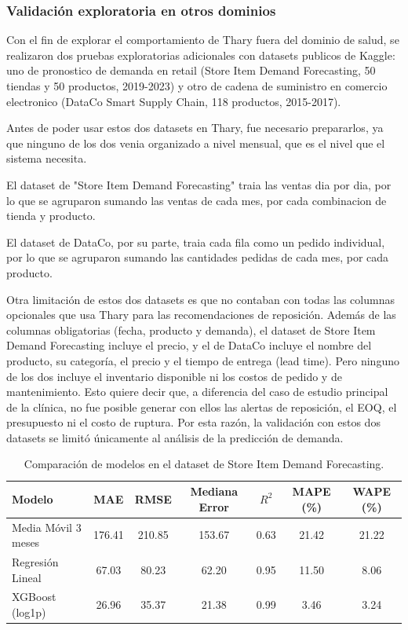 \subsubsection{Validación exploratoria en otros dominios}

Con el fin de explorar el comportamiento de Thary fuera del dominio de salud, se realizaron dos pruebas exploratorias adicionales con datasets publicos de Kaggle: uno de pronostico de demanda en retail (Store Item Demand Forecasting\cite{talukdar2023storeitem}, 50 tiendas y 50 productos, 2019-2023) y otro de cadena de suministro en comercio electronico (DataCo Smart\cite{constante2019dataco} Supply Chain, 118 productos, 2015-2017).

Antes de poder usar estos dos datasets en Thary, fue necesario prepararlos, ya que ninguno de los dos venia organizado a nivel mensual, que es el nivel que el sistema necesita.

El dataset de "Store Item Demand Forecasting" traia las ventas dia por dia, por lo que se agruparon sumando las ventas de cada mes, por cada combinacion de tienda y producto. 

El dataset de DataCo, por su parte, traia cada fila como un pedido individual, por lo que se agruparon sumando las cantidades pedidas de cada mes, por cada producto.

Otra limitación de estos dos datasets es que no contaban con todas las columnas opcionales que usa Thary para las recomendaciones de reposición. Además de las columnas obligatorias (fecha, producto y demanda), el dataset de Store Item Demand Forecasting incluye el precio, y el de DataCo incluye el nombre del producto, su categoría, el precio y el tiempo de entrega (lead time). Pero ninguno de los dos incluye el inventario disponible ni los costos de pedido y de mantenimiento. Esto quiere decir que, a diferencia del caso de estudio principal de la clínica, no fue posible generar con ellos las alertas de reposición, el EOQ, el presupuesto ni el costo de ruptura. Por esta razón, la validación con estos dos datasets se limitó únicamente al análisis de la predicción de demanda.

\begin{table}[H]
\centering
\caption{Comparación de modelos en el dataset de Store Item Demand Forecasting.}
\label{tab:store-item-modelos}
\renewcommand{\arraystretch}{1.3}
\begin{tabularx}{\textwidth}{|X|c|c|c|c|c|c|}
\hline
\textbf{Modelo} & \textbf{MAE} & \textbf{RMSE} & \textbf{Mediana Error} & \textbf{$R^2$} & \textbf{MAPE (\%)} & \textbf{WAPE (\%)} \\
\hline
Media Móvil 3 meses & 176.41 & 210.85 & 153.67 & 0.63 & 21.42 & 21.22 \\
\hline
Regresión Lineal & 67.03 & 80.23 & 62.20 & 0.95 & 11.50 & 8.06 \\
\hline
XGBoost (log1p) & 26.96 & 35.37 & 21.38 & 0.99 & 3.46 & 3.24 \\
\hline
\end{tabularx}
\end{table}

